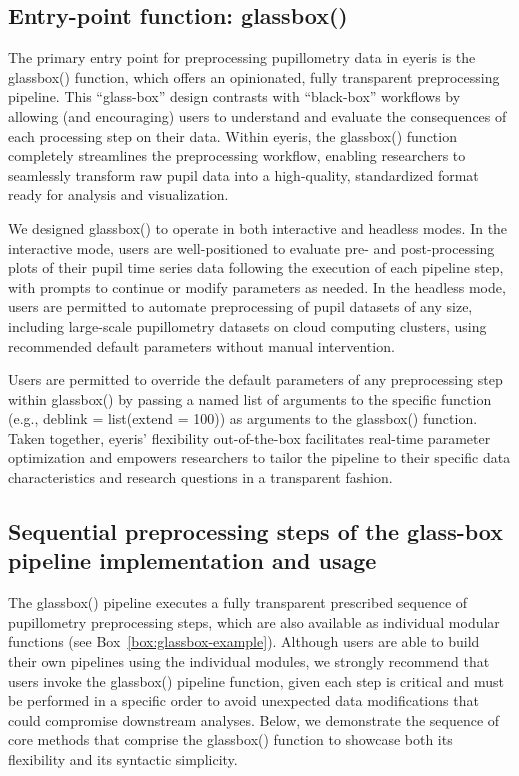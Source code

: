 \subsection{Entry-point function: glassbox()}
The primary entry point for preprocessing pupillometry data in eyeris is the glassbox() function, which offers an opinionated, fully transparent preprocessing pipeline. This “glass-box” design contrasts with “black-box” workflows by allowing (and encouraging) users to understand and evaluate the consequences of each processing step on their data. Within eyeris, the glassbox() function completely streamlines the preprocessing workflow, enabling researchers to seamlessly transform raw pupil data into a high-quality, standardized format ready for analysis and visualization.

We designed glassbox() to operate in both interactive and headless modes. In the interactive mode, users are well-positioned to evaluate pre- and post-processing plots of their pupil time series data following the execution of each pipeline step, with prompts to continue or modify parameters as needed. In the headless mode, users are permitted to automate preprocessing of pupil datasets of any size, including large-scale pupillometry datasets on cloud computing clusters, using recommended default parameters without manual intervention.

Users are permitted to override the default parameters of any preprocessing step within glassbox() by passing a named list of arguments to the specific function (e.g., deblink = list(extend = 100)) as arguments to the glassbox() function. Taken together, eyeris’ flexibility out-of-the-box facilitates real-time parameter optimization and empowers researchers to tailor the pipeline to their specific data characteristics and research questions in a transparent fashion.

\subsection{Sequential preprocessing steps of the glass-box pipeline implementation and usage}
The glassbox() pipeline executes a fully transparent prescribed sequence of pupillometry preprocessing steps, which are also available as individual modular functions (see Box~\ref{box:glassbox-example}). Although users are able to build their own pipelines using the individual modules, we strongly recommend that users invoke the glassbox() pipeline function, given each step is critical and must be performed in a specific order to avoid unexpected data modifications that could compromise downstream analyses. Below, we demonstrate the sequence of core methods that comprise the glassbox() function to showcase both its flexibility and its syntactic simplicity.

